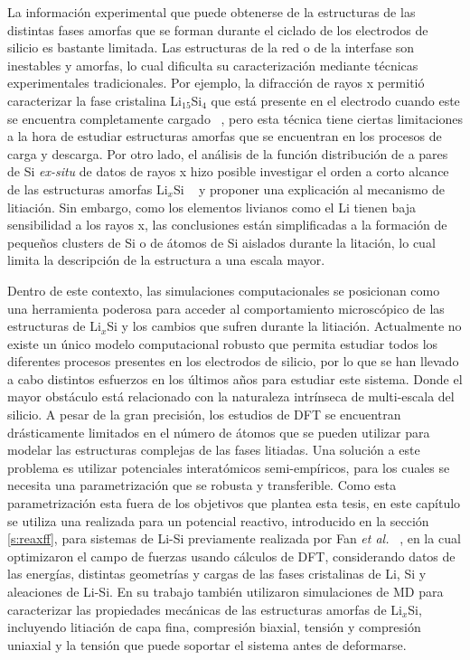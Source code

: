 La información experimental que puede obtenerse de la estructuras de las 
distintas fases amorfas que se forman durante el ciclado de los electrodos de 
silicio es bastante limitada. Las estructuras de la red o de la interfase son 
inestables y amorfas, lo cual dificulta su caracterización mediante técnicas
experimentales tradicionales. Por ejemplo, la difracción de rayos x permitió
caracterizar la fase cristalina Li$_{15}$Si$_4$ que está presente en el electrodo
cuando este se encuentra completamente cargado ~\cite{obrovac2004}, pero esta 
técnica tiene ciertas limitaciones a la hora de estudiar estructuras amorfas 
que se encuentran en los procesos de carga y descarga. Por otro lado, el análisis
de la función distribución de a pares de Si \textit{ex-situ} de datos de rayos x
hizo posible investigar el orden a corto alcance de las estructuras amorfas
Li$_x$Si ~\cite{key2011} y proponer una explicación al mecanismo de litiación.
Sin embargo, como los elementos livianos como el Li tienen baja sensibilidad a 
los rayos x, las conclusiones están simplificadas a la formación de pequeños 
clusters de Si o de átomos de Si aislados durante la litación, lo cual limita la 
descripción de la estructura a una escala mayor.

Dentro de este contexto, las simulaciones computacionales se posicionan como una
herramienta poderosa para acceder al comportamiento microscópico de las 
estructuras de Li$_x$Si y los cambios que sufren durante la litiación. Actualmente
no existe un único modelo computacional robusto que permita estudiar todos los
diferentes procesos presentes en los electrodos de silicio, por lo que se han 
llevado a cabo distintos esfuerzos en los últimos años para estudiar este sistema.
Donde el mayor obstáculo está relacionado con la naturaleza intrínseca de 
multi-escala del silicio. A pesar de la gran precisión, los estudios de DFT se
encuentran drásticamente limitados en el número de átomos que se pueden utilizar
para modelar las estructuras complejas de las fases litiadas. Una solución a este
problema es utilizar potenciales interatómicos semi-empíricos, para los cuales 
se necesita una parametrización que se robusta y transferible. Como esta 
parametrización esta fuera de los objetivos que plantea esta tesis, en este 
capítulo se utiliza una realizada para un potencial reactivo, introducido en 
la sección \ref{s:reaxff}, para sistemas de Li-Si previamente realizada por Fan 
\textit{et al.} ~\cite{fan2013}, en la cual optimizaron el campo de fuerzas usando 
cálculos de DFT, considerando datos de las energías, distintas geometrías y cargas
de las fases cristalinas de Li, Si y aleaciones de Li-Si. En su trabajo también
utilizaron simulaciones de MD para caracterizar las propiedades mecánicas de
las estructuras amorfas de Li$_x$Si, incluyendo litiación de capa fina, compresión
biaxial, tensión y compresión uniaxial y la tensión que puede soportar el sistema 
antes de deformarse.


